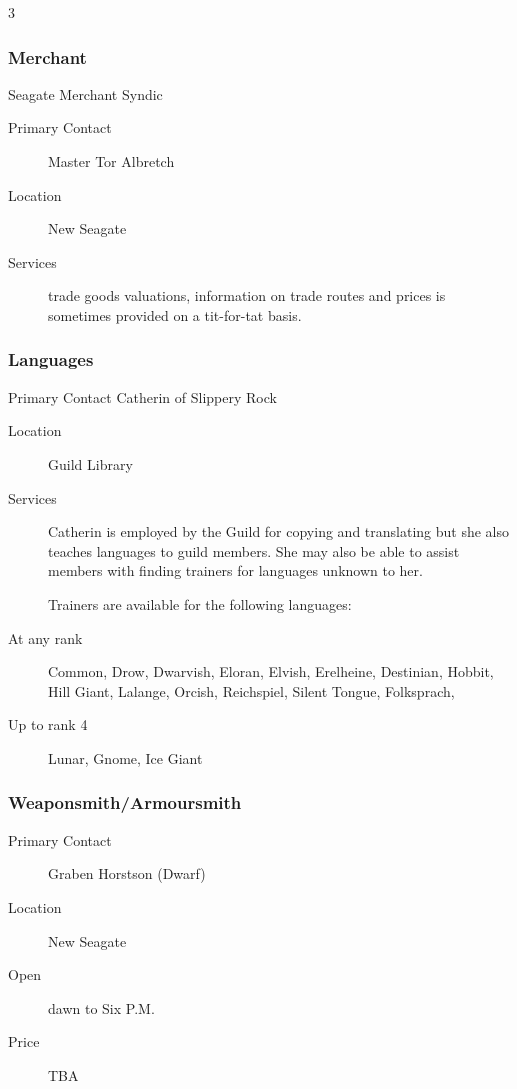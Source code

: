 \begin{multicols}{3}
\subsubsection{Merchant}

Seagate Merchant Syndic

\begin{description}
\item[Primary Contact] Master Tor Albretch
\item[Location] New Seagate
\item[Services] trade goods valuations, information on trade routes
  and prices is sometimes provided on a tit-for-tat basis.
\end{description}

\subsubsection{Languages}

Primary Contact Catherin of Slippery Rock

\begin{description}
\item[Location] Guild Library
\item[Services] Catherin is employed by the Guild for copying and
  translating but she also teaches languages to guild members. She may
  also be able to assist members with finding trainers for languages
  unknown to her.

Trainers are available for the following languages:
\item[At any rank] Common, Drow, Dwarvish, Eloran, Elvish, Erelheine,
  Destinian, Hobbit, Hill Giant, Lalange, Orcish, Reichspiel, Silent
  Tongue, Folksprach,
\item[Up to rank 4] Lunar, Gnome, Ice Giant
\end{description}

\subsubsection{Weaponsmith/Armoursmith}

\begin{description}
\item[Primary Contact] Graben Horstson (Dwarf)
\item[Location] New Seagate
\item[Open] dawn to Six P.M.
\item[Price] TBA
\end{description}


\end{multicols}
